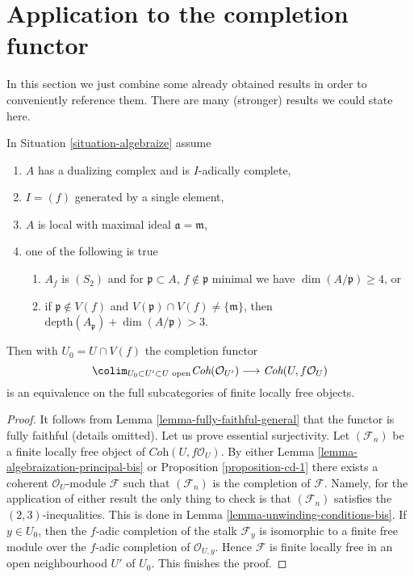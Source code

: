 \section{Application to the completion functor}
\label{section-completion-application}

\noindent
In this section we just combine some already obtained results
in order to conveniently reference them. There are many
(stronger) results we could state here.

\begin{lemma}
\label{lemma-equivalence-better}
In Situation \ref{situation-algebraize} assume
\begin{enumerate}
\item $A$ has a dualizing complex and is $I$-adically complete,
\item $I = (f)$ generated by a single element,
\item $A$ is local with maximal ideal $\mathfrak a = \mathfrak m$,
\item one of the following is true
\begin{enumerate}
\item $A_f$ is $(S_2)$ and for $\mathfrak p \subset A$,
$f \not \in \mathfrak p$ minimal we have $\dim(A/\mathfrak p) \geq 4$, or
\item if $\mathfrak p \not \in V(f)$ and
$V(\mathfrak p) \cap V(f) \not = \{\mathfrak m\}$, then
$\text{depth}(A_\mathfrak p) + \dim(A/\mathfrak p) > 3$.
\end{enumerate}
\end{enumerate}
Then with $U_0 = U \cap V(f)$ the completion functor
$$
\colim_{U_0 \subset U' \subset U\text{ open}}
\textit{Coh}(\mathcal{O}_{U'})
\longrightarrow
\textit{Coh}(U, f\mathcal{O}_U)
$$
is an equivalence on the full subcategories of finite locally free objects.
\end{lemma}

\begin{proof}
It follows from Lemma \ref{lemma-fully-faithful-general}
that the functor is fully faithful (details omitted).
Let us prove essential surjectivity. Let $(\mathcal{F}_n)$ be a finite locally
free object of $\textit{Coh}(U, f\mathcal{O}_U)$. By either
Lemma \ref{lemma-algebraization-principal-bis} or
Proposition \ref{proposition-cd-1}
there exists a coherent $\mathcal{O}_U$-module $\mathcal{F}$
such that $(\mathcal{F}_n)$ is the completion of $\mathcal{F}$.
Namely, for the application of either result the only thing to
check is that $(\mathcal{F}_n)$ satisfies the $(2, 3)$-inequalities.
This is done in Lemma \ref{lemma-unwinding-conditions-bis}. If $y \in U_0$,
then the $f$-adic completion of the stalk $\mathcal{F}_y$ is isomorphic to
a finite free module over the $f$-adic completion of $\mathcal{O}_{U, y}$.
Hence $\mathcal{F}$ is finite locally free in an open neighbourhood
$U'$ of $U_0$. This finishes the proof.
\end{proof}

